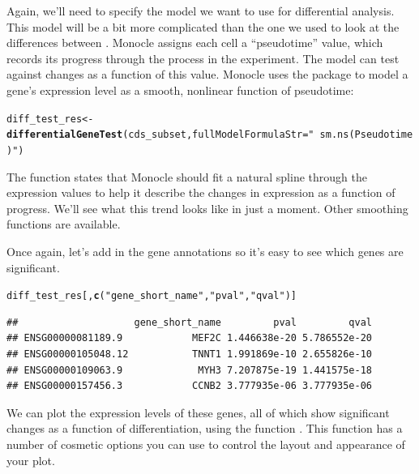 \documentclass[10pt,oneside]{article}\usepackage[]{graphicx}\usepackage[]{color}
\makeatletter
\newcommand{\hlstr}[1]{\textcolor[rgb]{0.192,0.494,0.8}{#1}}%
\newcommand{\hlstd}[1]{\textcolor[rgb]{0.345,0.345,0.345}{#1}}%
\newcommand{\hlkwb}[1]{\textcolor[rgb]{0.69,0.353,0.396}{#1}}%
\newcommand{\hlkwc}[1]{\textcolor[rgb]{0.333,0.667,0.333}{#1}}%
\newcommand{\hlkwd}[1]{\textcolor[rgb]{0.737,0.353,0.396}{\textbf{#1}}}%
\newenvironment{kframe}{%
 \def\at@end@of@kframe{}%
 \ifinner\ifhmode%
  \def\at@end@of@kframe{\end{minipage}}%
  \begin{minipage}{\columnwidth}%
 \fi\fi%
 \def\FrameCommand##1{\hskip\@totalleftmargin \hskip-\fboxsep
 \colorbox{shadecolor}{##1}\hskip-\fboxsep
     \hskip-\linewidth \hskip-\@totalleftmargin \hskip\columnwidth}%
 \MakeFramed {\advance\hsize-\width
   \@totalleftmargin\z@ \linewidth\hsize
   \@setminipage}}%
 {\par\unskip\endMakeFramed%
 \at@end@of@kframe}
\newenvironment{knitrout}{}{} %
\makeatother
\begin{document}
Again, we'll need to specify the model we want to use for differential analysis.  This model will be a bit more complicated than the one we used to look at the differences between .  Monocle assigns each cell a ``pseudotime'' value, which records its progress through the process in the experiment.  The model can test against changes as a function of this value. Monocle uses the  package to model a gene's expression level as a smooth, nonlinear function of pseudotime:
\begin{knitrout}
\color{fgcolor}\begin{kframe}
\begin{alltt}
\hlstd{diff_test_res} \hlkwb{<-} \hlkwd{differentialGeneTest}\hlstd{(cds_subset,}  \hlkwc{fullModelFormulaStr}\hlstd{=}\hlstr{"~sm.ns(Pseudotime)"}\hlstd{)}
\end{alltt}
\end{kframe}
\end{knitrout}

The  function states that Monocle should fit a natural spline through the expression values to help it describe the changes in expression as a function of progress. We'll see what this trend looks like in just a moment. Other smoothing functions are available.

Once again, let's add in the gene annotations so it's easy to see which genes are significant.
\begin{knitrout}
\color{fgcolor}\begin{kframe}
\begin{alltt}
\hlstd{diff_test_res[,}\hlkwd{c}\hlstd{(}\hlstr{"gene_short_name"}\hlstd{,} \hlstr{"pval"}\hlstd{,} \hlstr{"qval"}\hlstd{)]}
\end{alltt}
\begin{verbatim}
##                    gene_short_name         pval         qval
## ENSG00000081189.9            MEF2C 1.446638e-20 5.786552e-20
## ENSG00000105048.12           TNNT1 1.991869e-10 2.655826e-10
## ENSG00000109063.9             MYH3 7.207875e-19 1.441575e-18
## ENSG00000157456.3            CCNB2 3.777935e-06 3.777935e-06
\end{verbatim}
\end{kframe}
\end{knitrout}

We can plot the expression levels of these genes, all of which show significant changes as a function of differentiation, using the function . This function has a number of cosmetic options you can use to control the layout and appearance of your plot.
\end{document}

